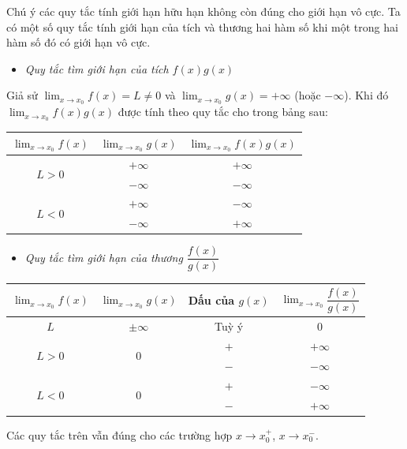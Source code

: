\documentclass[12pt,a4paper]{extarticle}
\begin{document}
\noindent Chú ý các quy tắc tính giới hạn hữu hạn không còn đúng cho giới hạn vô cực.
\noindent Ta có một số quy tắc tính giới hạn của tích và thương hai hàm số khi một trong hai hàm số đó có giới hạn vô cực.
\begin{itemize}
    \item \textit{Quy tắc tìm giới hạn của tích $f(x)g(x)$}
\end{itemize}
\noindent Giả sử $\lim_{x \to x_0} f(x) = L \ne 0$ và $\lim_{x \to x_0} g(x) = +\infty$ (hoặc $-\infty$). Khi đó $\lim_{x \to x_0} f(x)g(x)$ được tính theo quy tắc cho trong bảng sau:
\vspace{0.3cm}
\begin{center}
\renewcommand{\arraystretch}{1.3}
\begin{tabular}{|c|c|c|}
\hline
\textbf{$\lim_{x \to x_0} f(x)$} & \textbf{$\lim_{x \to x_0} g(x)$} & \textbf{$\lim_{x \to x_0} f(x)g(x)$} \\ \hline
\multirow{2}{*}{$L > 0$} & $+\infty$ & $+\infty$ \\ \cline{2-3}
& $-\infty$ & $-\infty$ \\ \hline
\multirow{2}{*}{$L < 0$} & $+\infty$ & $-\infty$ \\ \cline{2-3}
& $-\infty$ & $+\infty$ \\ \hline
\end{tabular}
\end{center}
\vspace{0.4cm}
\begin{itemize}
    \item \textit{Quy tắc tìm giới hạn của thương $\dfrac{f(x)}{g(x)}$}
\end{itemize}
\vspace{0.3cm}
\begin{center}
\renewcommand{\arraystretch}{1.3}
\begin{tabular}{|c|c|c|c|}
\hline
\textbf{$\lim_{x \to x_0} f(x)$} & \textbf{$\lim_{x \to x_0} g(x)$} & \textbf{Dấu của $g(x)$} & \textbf{$\lim_{x \to x_0} \dfrac{f(x)}{g(x)}$} \\ \hline
$L$ & $\pm\infty$ & Tuỳ ý & 0 \\ \hline
\multirow{2}{*}{$L > 0$} & \multirow{2}{*}{0} & $+$ & $+\infty$ \\ \cline{3-4}
& & $-$ & $-\infty$ \\ \hline
\multirow{2}{*}{$L < 0$} & \multirow{2}{*}{0} & $+$ & $-\infty$ \\ \cline{3-4}
& & $-$ & $+\infty$ \\ \hline
\end{tabular}
\end{center}
\vspace{0.4cm}
\noindent Các quy tắc trên vẫn đúng cho các trường hợp $x \to x_0^+$, $x \to x_0^-$.
\vspace{0.4cm}
\end{document}
